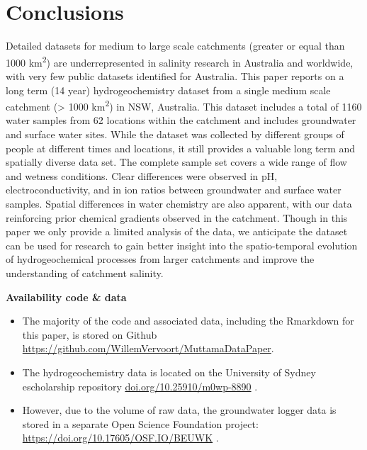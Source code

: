 \documentclass[, manuscript]{copernicus}
\providecommand{\tightlist}{%
  \setlength{\itemsep}{0pt}\setlength{\parskip}{0pt}}
\begin{document}
\section{Conclusions}

Detailed datasets for medium to large scale catchments (greater or equal
than 1000 km\textsuperscript{2}) are underrepresented in salinity
research in Australia and worldwide, with very few public datasets
identified for Australia. This paper reports on a long term (14 year)
hydrogeochemistry dataset from a single medium scale catchment
(\textgreater{} 1000 km\textsuperscript{2}) in NSW, Australia. This
dataset includes a total of 1160 water samples from 62 locations within
the catchment and includes groundwater and surface water sites. While
the dataset was collected by different groups of people at different
times and locations, it still provides a valuable long term and
spatially diverse data set. The complete sample set covers a wide range
of flow and wetness conditions. Clear differences were observed in pH,
electroconductivity, and in ion ratios between groundwater and surface
water samples. Spatial differences in water chemistry are also apparent,
with our data reinforcing prior chemical gradients observed in the
catchment. Though in this paper we only provide a limited analysis of
the data, we anticipate the dataset can be used for research to gain
better insight into the spatio-temporal evolution of hydrogeochemical
processes from larger catchments and improve the understanding of
catchment salinity.

\bigskip
{}

\bigskip

\noindent \textbf{Availability code \& data}

\begin{itemize}
\tightlist
\item
  The majority of the code and associated data, including the Rmarkdown
  for this paper, is stored on Github
  \url{https://github.com/WillemVervoort/MuttamaDataPaper}.\\
\item
  The hydrogeochemistry data is located on the University of Sydney
  escholarship repository \url{doi.org/10.25910/m0wp-8890}
  \citet{vervoort2025}.\\
\item
  However, due to the volume of raw data, the groundwater logger data is
  stored in a separate Open Science Foundation project:
  \url{https://doi.org/10.17605/OSF.IO/BEUWK} \citet{vervoort2024}.
\end{itemize}
\end{document}
